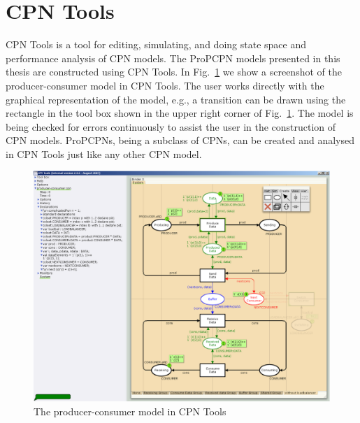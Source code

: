 \section{CPN Tools}
CPN Tools \cite{RefWorks:87} is a tool for editing, simulating, and doing state space and performance analysis of CPN models. The ProPCPN models presented in this thesis are constructed using CPN Tools. In Fig.~\ref{fig:cpntools} we show a screenshot of the producer-consumer model in CPN Tools. The user works directly with the graphical representation of the model, e.g., a transition can be drawn using the rectangle in the tool box shown in the upper right corner of Fig.~\ref{fig:cpntools}. The model is being checked for errors continuously to assist the user in the construction of CPN models. ProPCPNs, being a subclass of CPNs, can be created and analysed in CPN Tools just like any other CPN model. 


\begin{figure}[b!]
\centering
\includegraphics[width=\textwidth]{techniques_and_tool/graphics/CPNTools.eps}
\caption{The producer-consumer model in CPN Tools}
\label{fig:cpntools}
\end{figure}
